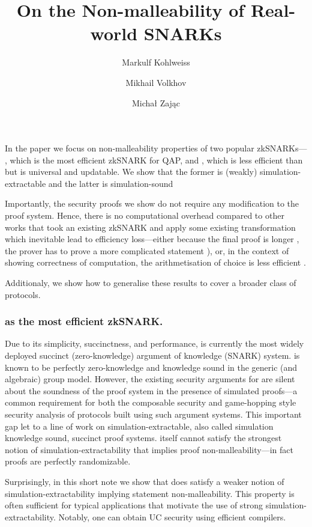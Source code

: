 \documentclass[runningheads,10pt]{llncs}
\title{On the Non-malleability of Real-world SNARKs}
\author{Markulf Kohlweiss\inst{1,2} \and Mikhail Volkhov\inst{1} \and Michał Zając\inst{3}}
\institute{University of Edinburgh, Edinburgh, UK \and IOHK \\ \email{mkohlwei@inf.ed.ac.uk}, \email{mikhail.volkhov@ed.ac.uk} \and Clearmatics, London UK \\ \email{m.p.zajac@gmail.com}}
\begin{document}
	\maketitle
	
	In the paper we focus on non-malleability properties of two popular zkSNARKs---\groth{}  \cite{EC:Groth16}, which is the most efficient zkSNARK for QAP, and \plonk{} \cite{EPRINT:GabWilCio19}, which is less efficient than \groth{} but is universal and updatable.
	We show that the former is (weakly) simulation-extractable and the latter is simulation-sound
	
	Importantly, the security proofs we show do not require any modification to the proof system. 
	Hence, there is no computational overhead compared to other works that took an existing zkSNARK and apply some existing transformation which inevitable lead to efficiency loss---either because the final proof is longer \cite{EPRINT:BowGab18}, the prover has to prove a more complicated statement \cite{ASIACCS:DerSla18,EPRINT:AbdRamSla20}), or, in the context of showing correctness of computation, the arithmetisation of choice is less efficient \cite{C:GroMal17}.	
	
	Additionaly, we show how to generalise these results to cover a broader class of protocols.  
	
	\subsubsection*{\groth{} as the most efficient zkSNARK.}
	Due to its simplicity, succinctness, and performance, \groth{} is
  currently the most widely deployed succinct (zero-knowledge) argument of
  knowledge (SNARK) system. \groth{} is known to be perfectly zero-knowledge and knowledge sound in the generic (and algebraic) group model. However, the existing security arguments for \groth{} are silent about the soundness of the proof system in the presence of simulated proofs---a common requirement for both the composable security and game-hopping style security analysis of protocols built using such argument systems. This important gap let to a line of work on simulation-extractable, also called simulation knowledge sound, succinct proof systems. \groth{} itself cannot satisfy the strongest
  notion of simulation-extractability that implies proof
  non-malleability---in fact proofs are perfectly randomizable.

  Surprisingly, in this short note we show that \groth{} does satisfy a
  weaker notion of simulation-extractability implying statement
  non-malleability. This property is often sufficient for typical
  applications that motivate the use of strong
  simulation-extractability. Notably, one can obtain UC security using
  efficient compilers.
	
\end{document}
